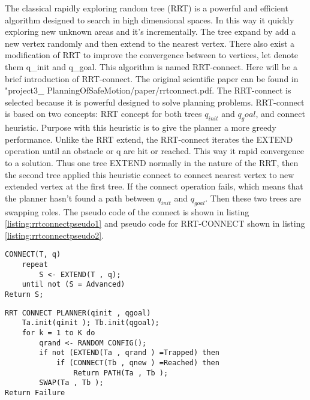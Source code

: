 The classical rapidly exploring random tree (RRT) is a powerful and efficient algorithm designed to search in high dimensional spaces. In this way it quickly exploring new unknown areas and it's incrementally. The tree expand by add a new vertex randomly and then extend to the nearest vertex.
There also exist a modification of RRT to improve the convergence between to vertices, let denote them q\_{ini}t and q\_{goal}. This algorithm is named RRT-connect.
Here will be a brief introduction of RRT-connect. The original scientific paper can be found in "project3\_ PlanningOfSafeMotion/paper/rrtconnect.pdf.
The RRT-connect is selected because it is powerful designed to solve planning problems. RRT-connect is based on two concepts: RRT concept for both trees $q_{init}$ and $q_goal$, and connect heuristic. Purpose with this heuristic is to give the planner a more greedy performance. Unlike the RRT extend, the RRT-connect iterates the EXTEND operation until an obstacle or q are hit or reached. This way it rapid convergence to a solution. Thus one tree EXTEND normally in the nature of the RRT, then the second tree applied this heuristic connect to connect nearest vertex to new extended vertex at the first tree. If the connect operation fails, which means that the planner hasn't found a path between $q_{init}$ and $q_{goal}$. Then these two trees are swapping roles.
The pseudo code of the connect is shown in listing \ref{listing:rrtconnectpseudo1} and pseudo code for RRT-CONNECT shown in listing \ref{listing:rrtconnectpseudo2}.

\begin{lstlisting}[caption=Peseudo code of the CONNECT, label=listing:rrtconnectpseudo1]
CONNECT(T, q) 
	repeat
		S <- EXTEND(T , q);
	until not (S = Advanced)
Return S;
\end{lstlisting}

\begin{lstlisting}[caption=Peseudo code of the RRT-Connect algorithm, label=listing:rrtconnectpseudo2]
RRT CONNECT PLANNER(qinit , qgoal)
	Ta.init(qinit ); Tb.init(qgoal);
	for k = 1 to K do
		qrand <- RANDOM CONFIG();
		if not (EXTEND(Ta , qrand ) =Trapped) then
			if (CONNECT(Tb , qnew ) =Reached) then
				Return PATH(Ta , Tb );
		SWAP(Ta , Tb );
Return Failure
\end{lstlisting}

